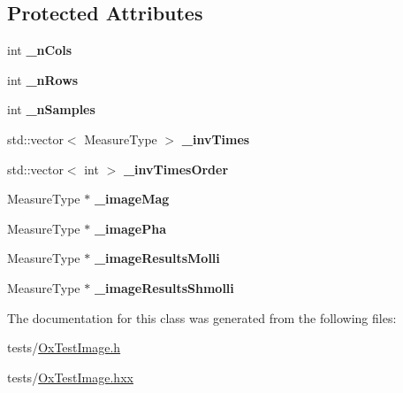 \subsection*{Protected Attributes}
\begin{DoxyCompactItemize}
\item 
\hypertarget{class_ox_1_1_test_image_aede6d17394f5b1d7aee6287c17482bed}{int {\bfseries \-\_\-n\-Cols}}\label{class_ox_1_1_test_image_aede6d17394f5b1d7aee6287c17482bed}

\item 
\hypertarget{class_ox_1_1_test_image_a2fca989633ec429545fefe579641eeb3}{int {\bfseries \-\_\-n\-Rows}}\label{class_ox_1_1_test_image_a2fca989633ec429545fefe579641eeb3}

\item 
\hypertarget{class_ox_1_1_test_image_a0b2de27b3ba5865c071a754c34e86bc7}{int {\bfseries \-\_\-n\-Samples}}\label{class_ox_1_1_test_image_a0b2de27b3ba5865c071a754c34e86bc7}

\item 
\hypertarget{class_ox_1_1_test_image_a9a3283dccb1476d113836134c3479328}{std\-::vector$<$ Measure\-Type $>$ {\bfseries \-\_\-inv\-Times}}\label{class_ox_1_1_test_image_a9a3283dccb1476d113836134c3479328}

\item 
\hypertarget{class_ox_1_1_test_image_aa7d94bb56b584ccae5619fcf5e55218c}{std\-::vector$<$ int $>$ {\bfseries \-\_\-inv\-Times\-Order}}\label{class_ox_1_1_test_image_aa7d94bb56b584ccae5619fcf5e55218c}

\item 
\hypertarget{class_ox_1_1_test_image_aa6d8862446566b0f1bc313de05cedd28}{Measure\-Type $\ast$ {\bfseries \-\_\-image\-Mag}}\label{class_ox_1_1_test_image_aa6d8862446566b0f1bc313de05cedd28}

\item 
\hypertarget{class_ox_1_1_test_image_a108ccefc1c986d4ad3265ec5601841c5}{Measure\-Type $\ast$ {\bfseries \-\_\-image\-Pha}}\label{class_ox_1_1_test_image_a108ccefc1c986d4ad3265ec5601841c5}

\item 
\hypertarget{class_ox_1_1_test_image_aa942d21740af38bc720db46a77fcea6c}{Measure\-Type $\ast$ {\bfseries \-\_\-image\-Results\-Molli}}\label{class_ox_1_1_test_image_aa942d21740af38bc720db46a77fcea6c}

\item 
\hypertarget{class_ox_1_1_test_image_abab3b898dade1792c251df511357be13}{Measure\-Type $\ast$ {\bfseries \-\_\-image\-Results\-Shmolli}}\label{class_ox_1_1_test_image_abab3b898dade1792c251df511357be13}

\end{DoxyCompactItemize}


The documentation for this class was generated from the following files\-:\begin{DoxyCompactItemize}
\item 
tests/\hyperlink{_ox_test_image_8h}{Ox\-Test\-Image.\-h}\item 
tests/\hyperlink{_ox_test_image_8hxx}{Ox\-Test\-Image.\-hxx}\end{DoxyCompactItemize}
